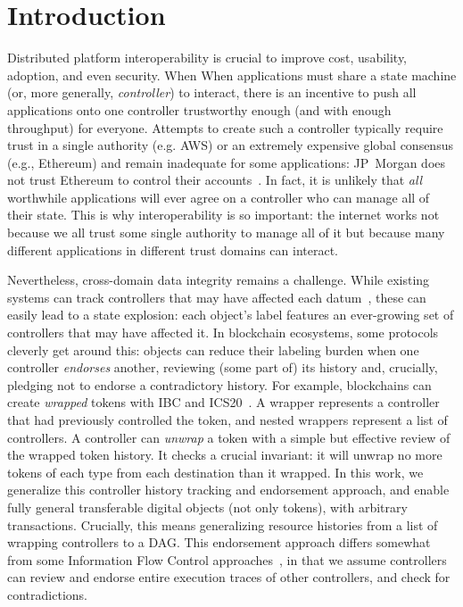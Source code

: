 \documentclass[a4paper,USenglish,cleveref, autoref, thm-restate, anonymous]{lipics-v2021}
\begin{document}
\section{Introduction}
Distributed platform interoperability is crucial to improve cost, usability, adoption, and even security. 
When When applications must share a state machine (or, more generally, \emph{controller}) to interact, there is an incentive to push all applications onto one controller trustworthy enough (and with enough throughput) for everyone. 
Attempts to create such a controller typically require trust in a single authority (e.g. AWS\cite{citation-needed}) or an extremely expensive global consensus (e.g., Ethereum) and remain inadequate for some applications:
 JP~Morgan does not trust Ethereum to control their accounts~\cite{onyx}.
In fact, it is unlikely that \emph{all} worthwhile applications will ever agree on a controller who can manage all of their state.
This is why interoperability is so important: the internet works not because we all trust some single authority to manage all of it but because many different applications in different trust domains can interact. 

Nevertheless, cross-domain data integrity remains a challenge.
While  existing systems can track controllers that may have affected each datum~\cite{dista,fabric}, these can easily lead to a state explosion: each object's label features an ever-growing set of controllers that may have affected it. 
In blockchain ecosystems, some protocols cleverly get around this: objects can reduce their labeling burden when one controller \emph{endorses} another, reviewing (some part of) its history and, crucially, pledging not to endorse a contradictory history.
For example, blockchains can create \emph{wrapped} tokens with IBC and ICS20~\cite{wrapped,ibc, ics20}. 
A wrapper represents a controller that had previously controlled the token, and nested wrappers represent a list of controllers. 
A controller can \emph{unwrap} a token with a simple but effective review of the wrapped token history. 
It checks a crucial invariant: it will unwrap no more tokens of each type from each destination than it wrapped. 
In this work, we generalize this controller history tracking and endorsement approach, and enable fully general transferable digital objects (not only tokens), with arbitrary transactions. 
Crucially, this means generalizing resource histories from a list of wrapping controllers to a DAG.
This endorsement approach differs somewhat from some Information Flow Control approaches~\cite{fabric, citation-needed}, in that we assume controllers can review and endorse entire execution traces of other controllers, and check for contradictions.
\end{document}
